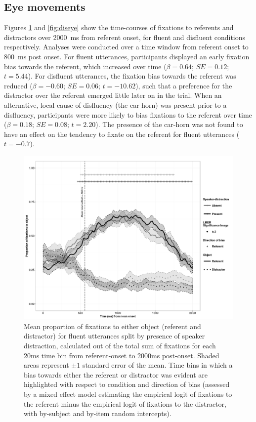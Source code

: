 \documentclass[a4paper,man,natbib]{apa6}
\newcommand*{\SE}{\mathit{SE}} %
\begin{document}
\subsection{Eye movements}
Figures \ref{fig:flueye} and \ref{fig:diseye} show the time-courses of fixations to referents and distractors over 2000~ms from referent onset, for fluent and disfluent conditions respectively.
Analyses were conducted over a time window from referent onset to 800~ms post onset.
For fluent utterances, participants displayed an early fixation bias towards the referent, which increased over time ($\beta = 0.64$; $\SE = 0.12$; $t=5.44$). 
For disfluent utterances, the fixation bias towards the referent was reduced ($\beta = -0.60$; $\SE = 0.06$; $t=-10.62$), such that a preference for the distractor over the referent emerged little later on in the trial.
When an alternative, local cause of disfluency (the car-horn) was present prior to a disfluency, participants were more likely to bias fixations to the referent over time ($\beta = 0.18$; $\SE = 0.08$; $t=2.20$).
The presence of the car-horn was not found to have an effect on the tendency to fixate on the referent for fluent utterances ($t=-0.7$).

\begin{figure}[Ht]
  \centering
	\includegraphics[scale=.5]{fluent.png}
  \caption{Mean proportion of fixations to either object (referent and distractor) for fluent utterances split by presence of speaker distraction, calculated out of the total sum of fixations for each 20ms time bin from referent-onset to 2000ms post-onset. Shaded areas represent $\pm 1$ standard error of the mean. Time bins in which a bias towards either the referent or distractor was evident are highlighted with respect to condition and direction of bias (assessed by a mixed effect model estimating the empirical logit of fixations to the referent minus the empirical logit of fixations to the distractor, with by-subject and by-item random intercepts).}
  \label{fig:flueye}
\end{figure}
\end{document}
